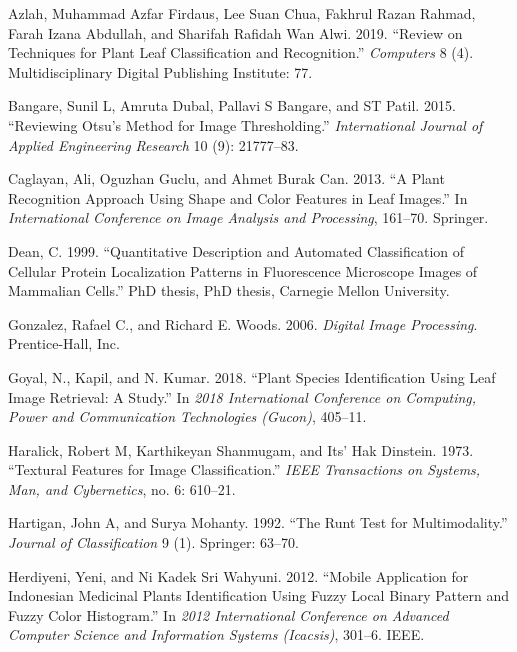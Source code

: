 \documentclass{article}
\begin{document}
\leavevmode\hypertarget{ref-articlepl}{}%
Azlah, Muhammad Azfar Firdaus, Lee Suan Chua, Fakhrul Razan Rahmad,
Farah Izana Abdullah, and Sharifah Rafidah Wan Alwi. 2019. ``Review on
Techniques for Plant Leaf Classification and Recognition.''
\emph{Computers} 8 (4). Multidisciplinary Digital Publishing Institute:
77.

\leavevmode\hypertarget{ref-bangare2015reviewing}{}%
Bangare, Sunil L, Amruta Dubal, Pallavi S Bangare, and ST Patil. 2015.
``Reviewing Otsu's Method for Image Thresholding.'' \emph{International
Journal of Applied Engineering Research} 10 (9): 21777--83.

\leavevmode\hypertarget{ref-inproceedings1}{}%
Caglayan, Ali, Oguzhan Guclu, and Ahmet Burak Can. 2013. ``A Plant
Recognition Approach Using Shape and Color Features in Leaf Images.'' In
\emph{International Conference on Image Analysis and Processing},
161--70. Springer.

\leavevmode\hypertarget{ref-article31}{}%
Dean, C. 1999. ``Quantitative Description and Automated Classification
of Cellular Protein Localization Patterns in Fluorescence Microscope
Images of Mammalian Cells.'' PhD thesis, PhD thesis, Carnegie Mellon
University.

\leavevmode\hypertarget{ref-book1}{}%
Gonzalez, Rafael C., and Richard E. Woods. 2006. \emph{Digital Image
Processing}. Prentice-Hall, Inc.

\leavevmode\hypertarget{ref-8675114}{}%
Goyal, N., Kapil, and N. Kumar. 2018. ``Plant Species Identification
Using Leaf Image Retrieval: A Study.'' In \emph{2018 International
Conference on Computing, Power and Communication Technologies (Gucon)},
405--11.

\leavevmode\hypertarget{ref-articletx}{}%
Haralick, Robert M, Karthikeyan Shanmugam, and Its' Hak Dinstein. 1973.
``Textural Features for Image Classification.'' \emph{IEEE Transactions
on Systems, Man, and Cybernetics}, no. 6: 610--21.

\leavevmode\hypertarget{ref-hartigan1992runt}{}%
Hartigan, John A, and Surya Mohanty. 1992. ``The Runt Test for
Multimodality.'' \emph{Journal of Classification} 9 (1). Springer:
63--70.

\leavevmode\hypertarget{ref-inproceedings}{}%
Herdiyeni, Yeni, and Ni Kadek Sri Wahyuni. 2012. ``Mobile Application
for Indonesian Medicinal Plants Identification Using Fuzzy Local Binary
Pattern and Fuzzy Color Histogram.'' In \emph{2012 International
Conference on Advanced Computer Science and Information Systems
(Icacsis)}, 301--6. IEEE.
\end{document}
